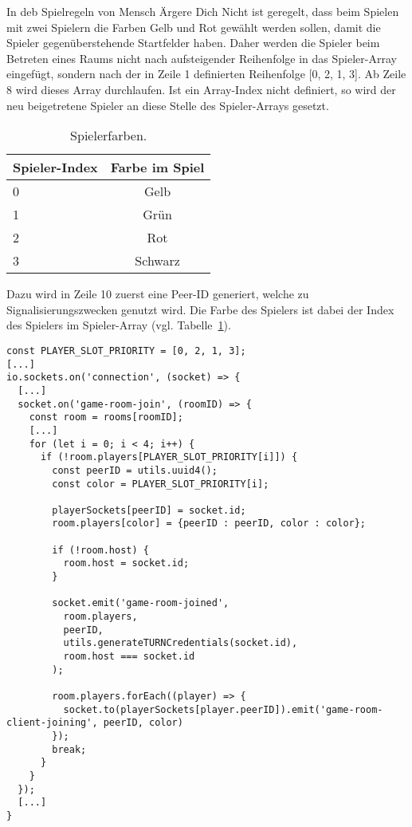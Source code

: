 In deb Spielregeln von \glqq{}Mensch Ärgere Dich Nicht\grqq{} ist geregelt, dass beim Spielen mit zwei Spielern die Farben Gelb und Rot gewählt werden sollen, damit die Spieler gegenüberstehende Startfelder haben. Daher werden die Spieler beim Betreten eines Raums nicht nach aufsteigender Reihenfolge in das Spieler-Array eingefügt, sondern nach der in Zeile 1 definierten Reihenfolge [0, 2, 1, 3]. Ab Zeile 8 wird dieses Array durchlaufen. Ist ein Array-Index nicht definiert, so wird der neu beigetretene Spieler an diese Stelle des Spieler-Arrays gesetzt.\par

\begin{table}[ht]
\centering
\begin{tabular}[t]{lc}
\toprule
Spieler-Index&Farbe im Spiel\\
\midrule
0&Gelb\\
1&Grün\\
2&Rot\\
3&Schwarz\\
\bottomrule
\end{tabular}
\caption{Spielerfarben.}
\label{table:playercolors}
\end{table}

Dazu wird in Zeile 10 zuerst eine Peer-ID generiert, welche zu Signalisierungszwecken genutzt wird. Die \glqq{}Farbe\grqq{} des Spielers ist dabei der Index des Spielers im Spieler-Array (vgl. Tabelle~\ref{table:playercolors}).\par

\vspace{11pt}
\lstset{language=js, style=STYLE_CODE_JS}
\begin{singlespace}
\begin{lstlisting}[caption={Event zum Betreten eines Raums -- Server.js}, captionpos=b, label={lst:join}]
const PLAYER_SLOT_PRIORITY = [0, 2, 1, 3];
[...]
io.sockets.on('connection', (socket) => {
  [...]
  socket.on('game-room-join', (roomID) => {
    const room = rooms[roomID];
    [...]
    for (let i = 0; i < 4; i++) {
      if (!room.players[PLAYER_SLOT_PRIORITY[i]]) {
        const peerID = utils.uuid4();
        const color = PLAYER_SLOT_PRIORITY[i];

        playerSockets[peerID] = socket.id;
        room.players[color] = {peerID : peerID, color : color};

        if (!room.host) {
          room.host = socket.id;
        }

        socket.emit('game-room-joined', 
          room.players, 
          peerID, 
          utils.generateTURNCredentials(socket.id), 
          room.host === socket.id
        );

        room.players.forEach((player) => {
          socket.to(playerSockets[player.peerID]).emit('game-room-client-joining', peerID, color)
        });
        break;
      }
    }
  });
  [...]
}
\end{lstlisting}
\end{singlespace}

